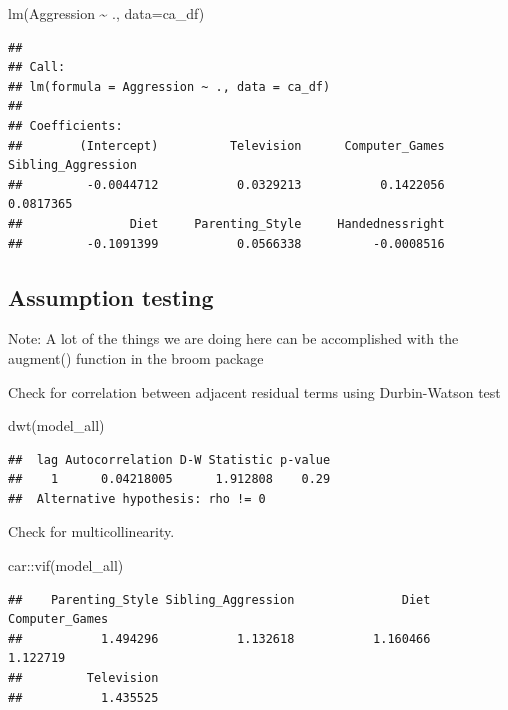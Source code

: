 \documentclass[
]{book}
\newenvironment{Shaded}{\begin{snugshade}}{\end{snugshade}}
\newcommand{\AttributeTok}[1]{\textcolor[rgb]{0.77,0.63,0.00}{#1}}
\newcommand{\FunctionTok}[1]{\textcolor[rgb]{0.00,0.00,0.00}{#1}}
\newcommand{\NormalTok}[1]{#1}
\newcommand{\SpecialCharTok}[1]{\textcolor[rgb]{0.00,0.00,0.00}{#1}}
\begin{document}
\begin{Shaded}
\begin{Highlighting}[]
\FunctionTok{lm}\NormalTok{(Aggression }\SpecialCharTok{\textasciitilde{}}\NormalTok{ ., }\AttributeTok{data=}\NormalTok{ca\_df)}
\end{Highlighting}
\end{Shaded}

\begin{verbatim}
## 
## Call:
## lm(formula = Aggression ~ ., data = ca_df)
## 
## Coefficients:
##        (Intercept)          Television      Computer_Games  Sibling_Aggression  
##         -0.0044712           0.0329213           0.1422056           0.0817365  
##               Diet     Parenting_Style     Handednessright  
##         -0.1091399           0.0566338          -0.0008516
\end{verbatim}

\hypertarget{assumption-testing}{%
\subsection{Assumption testing}\label{assumption-testing}}

Note: A lot of the things we are doing here can be accomplished with the augment() function in the broom package

Check for correlation between adjacent residual terms using Durbin-Watson test

\begin{Shaded}
\begin{Highlighting}[]
\FunctionTok{dwt}\NormalTok{(model\_all)}
\end{Highlighting}
\end{Shaded}

\begin{verbatim}
##  lag Autocorrelation D-W Statistic p-value
##    1      0.04218005      1.912808    0.29
##  Alternative hypothesis: rho != 0
\end{verbatim}

Check for multicollinearity.

\begin{Shaded}
\begin{Highlighting}[]
\NormalTok{car}\SpecialCharTok{::}\FunctionTok{vif}\NormalTok{(model\_all)}
\end{Highlighting}
\end{Shaded}

\begin{verbatim}
##    Parenting_Style Sibling_Aggression               Diet     Computer_Games 
##           1.494296           1.132618           1.160466           1.122719 
##         Television 
##           1.435525
\end{verbatim}
\end{document}
